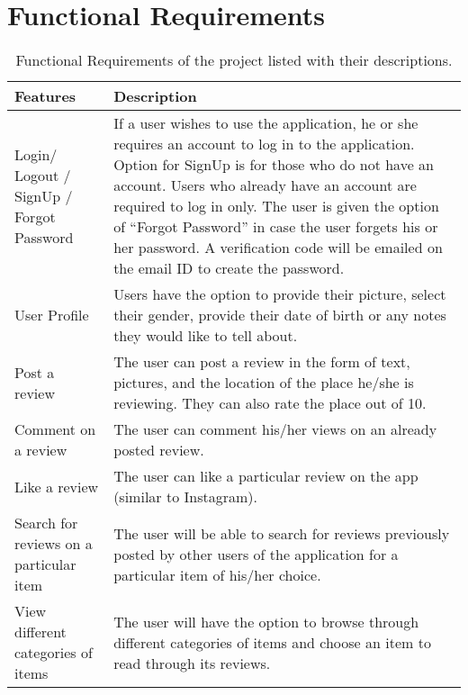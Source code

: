 \documentclass[11pt]{extarticle}
\begin{document}
\section{Functional Requirements}
\begin{table}[H]
    \begin{center}
        \begin{tabular}{ |m{6cm}|p{6cm}| } 
           \hline
           \textbf{Features} & \textbf{Description} \\
           \hline
           Login/ Logout / SignUp / Forgot Password & If a user wishes to use the application, he or she requires an account to log in to the application. Option for SignUp is for those who do not have an account. Users who already have an account are required to log in only. The user is given the option of ``Forgot Password” in case the user forgets his or her password. A verification code will be emailed on the email ID to create the password.\\
           \hline
           User Profile & Users have the option to provide their picture, select their gender, provide their date of birth or any notes they would like to tell about.\\
           \hline
           Post a review & The user can post a review in the form of text, pictures, and the location of the place he/she is reviewing. They can also rate the place out of 10.\\
           \hline
           Comment on a review & The user can comment his/her views on an already posted review.\\
           \hline
           Like a review & The user can like a particular review on the app (similar to Instagram).\\
           \hline
           Search for reviews on a particular item & The user will be able to search for reviews previously posted by other users of the application for a particular item of his/her choice.\\
           \hline
           View different categories of items & The user will have the option to browse through different categories of items and choose an item to read through its reviews.\\
           \hline
        \end{tabular}
    \end{center}
    \caption{\label{tab:Table 1} Functional Requirements of the project listed with their descriptions.}
\end{table}
\end{document}
